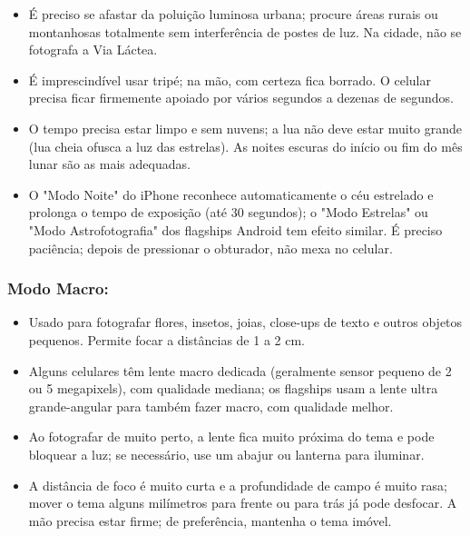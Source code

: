 \begin{itemize}
  \item É preciso se afastar da poluição luminosa urbana; procure áreas rurais ou montanhosas totalmente sem interferência de postes de luz. Na cidade, não se fotografa a Via Láctea.
  \item É imprescindível usar tripé; na mão, com certeza fica borrado. O celular precisa ficar firmemente apoiado por vários segundos a dezenas de segundos.
  \item O tempo precisa estar limpo e sem nuvens; a lua não deve estar muito grande (lua cheia ofusca a luz das estrelas). As noites escuras do início ou fim do mês lunar são as mais adequadas.
  \item O "Modo Noite" do iPhone reconhece automaticamente o céu estrelado e prolonga o tempo de exposição (até 30 segundos); o "Modo Estrelas" ou "Modo Astrofotografia" dos flagships Android tem efeito similar. É preciso paciência; depois de pressionar o obturador, não mexa no celular.
\end{itemize}

\subsubsection*{Modo Macro:}

\begin{itemize}
  \item Usado para fotografar flores, insetos, joias, close-ups de texto e outros objetos pequenos. Permite focar a distâncias de 1 a 2 cm.
  \item Alguns celulares têm lente macro dedicada (geralmente sensor pequeno de 2 ou 5 megapixels), com qualidade mediana; os flagships usam a lente ultra grande-angular para também fazer macro, com qualidade melhor.
  \item Ao fotografar de muito perto, a lente fica muito próxima do tema e pode bloquear a luz; se necessário, use um abajur ou lanterna para iluminar.
  \item A distância de foco é muito curta e a profundidade de campo é muito rasa; mover o tema alguns milímetros para frente ou para trás já pode desfocar. A mão precisa estar firme; de preferência, mantenha o tema imóvel.
\end{itemize}

